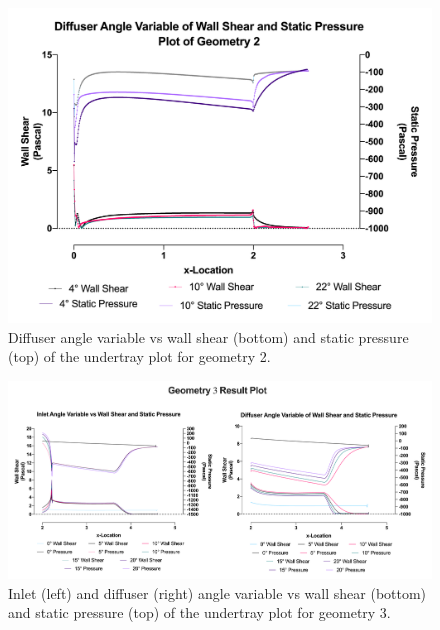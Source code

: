 \begin{figure}
    \centering
    \includegraphics[scale=0.82]{Figures/2D_OF/2D_OF_A2_PRESS_WShear_PLOT.png}
    \caption{Diffuser angle variable vs wall shear (bottom) and static pressure (top) of the undertray plot for geometry 2.}
    \label{fig:2D_OF_A2_PLOT}
\end{figure}

\begin{figure}
    \centering
    \includegraphics[scale=0.82]{Figures/2D_OF/2D_OF_A3_PRESS_WShear_PLOT.png}
    \caption{Inlet (left) and diffuser (right) angle variable vs wall shear (bottom) and static pressure (top) of the undertray plot for geometry 3.}
    \label{fig:2D_OF_A3_PLOT}
\end{figure}


